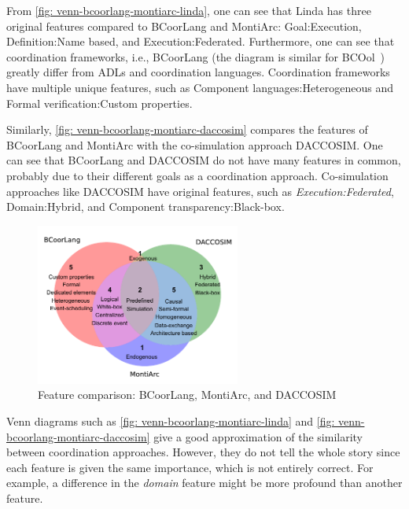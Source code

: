 \documentclass[runningheads]{llncs}
\begin{document}
From \autoref{fig: venn-bcoorlang-montiarc-linda}, one can see that Linda has three original features compared to BCoorLang and MontiArc:
\textsf{Goal:Execution}, \textsf{Definition:Name based}, and \textsf{Execution:Federated}.
Furthermore, one can see that coordination frameworks, i.e., BCoorLang (the diagram is similar for BCOol~\cite{varalarsenBehavioralCoordinationOperator2015,varalarsenBCOolBehavioralCoordination2016}) greatly differ from ADLs and coordination languages.
Coordination frameworks have multiple unique features, such as \textsf{Component languages:Heterogeneous} and \textsf{Formal verification:Custom properties}.


Similarly, \autoref{fig: venn-bcoorlang-montiarc-daccosim} compares the features of BCoorLang and MontiArc with the co-simulation approach DACCOSIM.
One can see that BCoorLang and DACCOSIM do not have many features in common, probably due to their different goals as a coordination approach.
Co-simulation approaches like DACCOSIM have original features, such as \textit{Execution:Federated}, \textsf{Domain:Hybrid}, and \textsf{Component transparency:Black-box}.

\begin{figure}[ht]
	\centering
	\includegraphics[width=0.6\textwidth]{images/venn_bcoorlang_montiarc_daccosim}
	\caption{Feature comparison: BCoorLang, MontiArc, and DACCOSIM}
	\label{fig: venn-bcoorlang-montiarc-daccosim}
\end{figure}

Venn diagrams such as \autoref{fig: venn-bcoorlang-montiarc-linda} and \autoref{fig: venn-bcoorlang-montiarc-daccosim} give a good approximation of the similarity between coordination approaches.
However, they do not tell the whole story since each feature is given the same importance, which is not entirely correct.
For example, a difference in the \textit{domain} feature might be more profound than another feature.
\end{document}
